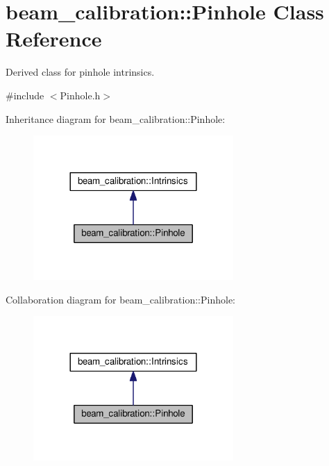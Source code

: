 \hypertarget{classbeam__calibration_1_1_pinhole}{}\section{beam\+\_\+calibration\+:\+:Pinhole Class Reference}
\label{classbeam__calibration_1_1_pinhole}


Derived class for pinhole intrinsics.  




{\ttfamily \#include $<$Pinhole.\+h$>$}



Inheritance diagram for beam\+\_\+calibration\+:\+:Pinhole\+:\nopagebreak
\begin{figure}[H]
\begin{center}
\leavevmode
\includegraphics[width=216pt]{classbeam__calibration_1_1_pinhole__inherit__graph}
\end{center}
\end{figure}


Collaboration diagram for beam\+\_\+calibration\+:\+:Pinhole\+:\nopagebreak
\begin{figure}[H]
\begin{center}
\leavevmode
\includegraphics[width=216pt]{classbeam__calibration_1_1_pinhole__coll__graph}
\end{center}
\end{figure}
